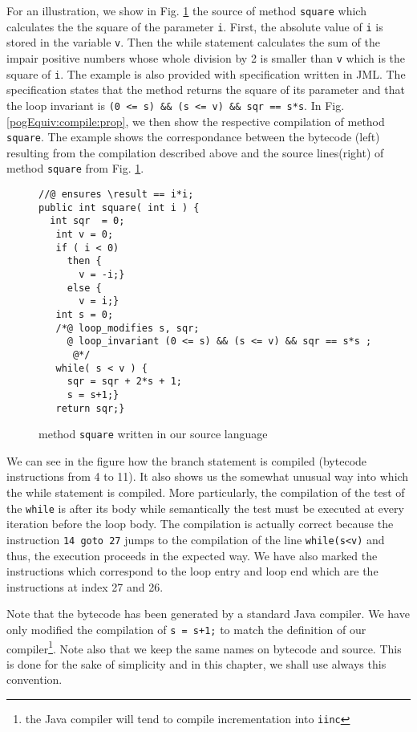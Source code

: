 For an illustration, we show in Fig. \ref{pogComp:source:example} the source of method \lstinline!square! which calculates the 
the   square of the parameter \lstinline!i!.  First, the absolute value of \lstinline!i! is stored in the variable \lstinline!v!.
Then  the while statement  calculates the sum of the impair positive numbers whose whole division by 2 is smaller than
\lstinline!v! which is the square of \lstinline!i!.  The example is also
provided with specification written in JML. The specification states
that the method returns the square of its parameter and that the loop
invariant is \lstinline!(0 <= s) && (s <= v) && sqr == s*s!. In Fig. \ref{pogEquiv:compile:prop}, we 
then show the respective compilation of method \lstinline!square!.
The example shows the correspondance between  the bytecode (left) resulting from the compilation described above and the source lines(right)
 of method  \lstinline!square! from Fig. \ref{pogComp:source:example}.



\begin{figure}[ht!]
 \begin{lstlisting}[frame=trbl] 
//@ ensures \result == i*i; 
public int square( int i ) {
  int sqr  = 0;
   int v = 0;
   if ( i < 0)
     then {
       v = -i;} 
     else {
       v = i;}
   int s = 0;
   /*@ loop_modifies s, sqr;
     @ loop_invariant (0 <= s) && (s <= v) && sqr == s*s ;
      @*/
   while( s < v ) {
     sqr = sqr + 2*s + 1;
     s = s+1;}
   return sqr;}
 \end{lstlisting}
 \caption{\sc method  \lstinline!square! written in our source language}
 \label{pogComp:source:example}
 \end{figure}


We can see in the figure how the branch statement is compiled (bytecode instructions from 4 to 11).
 It also shows us the somewhat unusual way into which 
the while statement is compiled. More particularly, the compilation of the test of the \lstinline!while! is after its body while semantically the test must be executed 
at every iteration before the loop body.  The compilation is actually correct because the instruction 
\lstinline!14 goto 27! jumps to the compilation of the line \lstinline!while(s<v)! and thus, the execution proceeds in the expected way.
 We have also marked the instructions which correspond to the loop entry and loop end  which are the instructions at index 27 and 26. 
 

Note that the bytecode has been generated by a standard Java compiler. We have only modified the compilation of  \lstinline!s = s+1;! to match the definition 
of our compiler\footnote{the Java compiler will tend to compile incrementation into \lstinline!iinc!}. Note also that we keep the same names on bytecode and source.
This is done for the sake of simplicity and in this chapter, we shall use always this convention.

